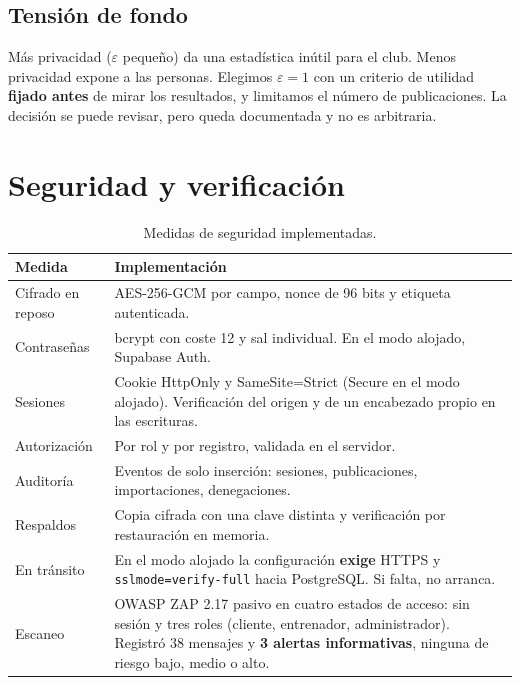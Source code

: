 \documentclass[11pt]{article}
\begin{document}
\subsection*{Tensión de fondo}
Más privacidad ($\varepsilon$ pequeño) da una estadística inútil para el club. Menos privacidad expone a las personas. Elegimos $\varepsilon = 1$ con un criterio de utilidad \textbf{fijado antes} de mirar los resultados, y limitamos el número de publicaciones. La decisión se puede revisar, pero queda documentada y no es arbitraria.

\section{Seguridad y verificación}

\begin{table}[H]
\centering\small
\begin{tabularx}{\textwidth}{@{}p{3cm}Y@{}}
\toprule
\textbf{Medida} & \textbf{Implementación} \\
\midrule
Cifrado en reposo & AES-256-GCM por campo, nonce de 96 bits y etiqueta autenticada. \\
Contraseñas & bcrypt con coste 12 y sal individual. En el modo alojado, Supabase Auth. \\
Sesiones & Cookie HttpOnly y SameSite=Strict (Secure en el modo alojado). Verificación del origen y de un encabezado propio en las escrituras. \\
Autorización & Por rol y por registro, validada en el servidor. \\
Auditoría & Eventos de solo inserción: sesiones, publicaciones, importaciones, denegaciones. \\
Respaldos & Copia cifrada con una clave distinta y verificación por restauración en memoria. \\
En tránsito & En el modo alojado la configuración \textbf{exige} HTTPS y \texttt{sslmode=verify-full} hacia PostgreSQL. Si falta, no arranca. \\
Escaneo & OWASP ZAP 2.17 pasivo en cuatro estados de acceso: sin sesión y tres roles (cliente, entrenador, administrador). Registró 38 mensajes y \textbf{3 alertas informativas}, ninguna de riesgo bajo, medio o alto. \\
\bottomrule
\end{tabularx}
\caption{Medidas de seguridad implementadas.}
\end{table}
\end{document}
